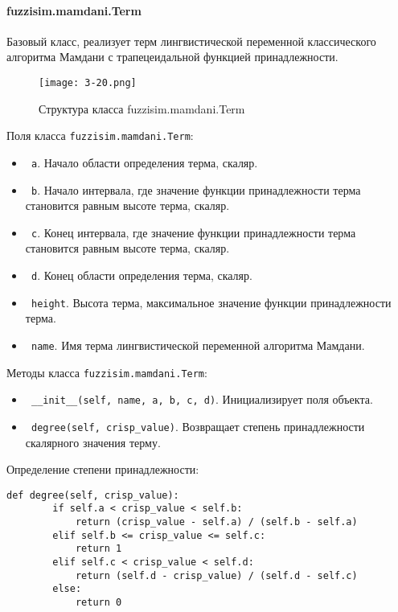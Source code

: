 \paragraph{fuzzisim.mamdani.Term}

Базовый класс, реализует терм лингвистической переменной классического алгоритма Мамдани с трапецеидальной функцией принадлежности.

\begin{figure}[ht]
	\centering
	\texttt{[image: 3-20.png]}
	\caption{ Структура класса fuzzisim.mamdani.Term}
\end{figure}

Поля класса \lstinline!fuzzisim.mamdani.Term!:
\begin{itemize}
	\item \lstinline! a!. Начало области определения терма, скаляр.
	\item \lstinline! b!. Начало интервала, где значение функции принадлежности терма становится равным высоте терма, скаляр.
	\item \lstinline! c!. Конец интервала, где значение функции принадлежности терма становится равным высоте терма, скаляр.
	\item \lstinline! d!.   Конец области определения терма, скаляр.
	\item \lstinline! height!. Высота терма, максимальное значение функции принадлежности терма.
	\item \lstinline! name!. Имя терма лингвистической переменной алгоритма Мамдани.
\end{itemize}


Методы класса \lstinline!fuzzisim.mamdani.Term!:
\begin{itemize}
	\item \lstinline! __init__(self, name, a, b, c, d)!. Инициализирует поля объекта.
	\item \lstinline! degree(self, crisp_value)!. Возвращает степень принадлежности скалярного значения терму.
\end{itemize}

Определение степени принадлежности:
\begin{lstlisting}[style=pythonstyle,caption={  }, label=lst:func:1]
	def degree(self, crisp_value):
		if self.a < crisp_value < self.b:
			return (crisp_value - self.a) / (self.b - self.a)
		elif self.b <= crisp_value <= self.c:
			return 1
		elif self.c < crisp_value < self.d:
			return (self.d - crisp_value) / (self.d - self.c)
		else:
			return 0
\end{lstlisting}



